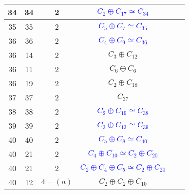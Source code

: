 \documentclass[12pt, openany]{report}
\begin{document}
\begin{tabular}{|c||c|c|c|c|c|}
\hline  34 & 34 & 2 & \textcolor{blue}{$C_{2} \oplus C_{17} \simeq C_{34}$}\\
\hline  35 & 35 & 2 & \textcolor{blue}{$C_{5}\oplus C_{7} \simeq C_{35}$} \\
\hline  36 & 36 & 2 &\textcolor{blue}{$C_{4} \oplus C_{9} \simeq C_{36}$} \\ 
\hline  36 & 14 & 2 & $C_{3} \oplus C_{12}$  \\ 
\hline  36 & 11 & 2 & $C_{6} \oplus C_{6}$  \\ 
\hline  36 & 19 & 2 &$ C_{2} \oplus C_{18}$\\
\hline  37 & 37 & 2 & $C_{37}$ \\
\hline  38 & 38 & 2 & \textcolor{blue}{$ C_{2}\oplus C_{19} \simeq C_{38}$} \\
\hline  39& 39 & 2 &\textcolor{blue}{$C_{3}\oplus C_{13} \simeq C_{39}$} \\
\hline  40& 40 & 2 & \textcolor{blue}{$C_{5}\oplus C_{8} \simeq C_{40}$} \\
\hline  40& 21 & 2 & \textcolor{blue}{$ C_{4} \oplus C_{10} \simeq C_{2} \oplus C_{20}$} \\
\hline  40& 21 & 2& \textcolor{blue}{$C_{2}\oplus C_{4}\oplus C_{5} \simeq C_{2} \oplus C_{20}$}\\
\hline  40&12 &$4-(a)$ & $C_{2}\oplus C_{2}\oplus C_{10}$ \\

\end{tabular}
\end{document}
